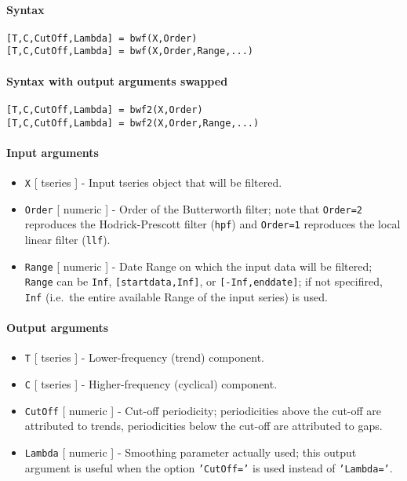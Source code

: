 


	\paragraph{Syntax}

\begin{verbatim}
[T,C,CutOff,Lambda] = bwf(X,Order)
[T,C,CutOff,Lambda] = bwf(X,Order,Range,...)
\end{verbatim}

\paragraph{Syntax with output arguments
swapped}

\begin{verbatim}
[T,C,CutOff,Lambda] = bwf2(X,Order)
[T,C,CutOff,Lambda] = bwf2(X,Order,Range,...)
\end{verbatim}

\paragraph{Input arguments}

\begin{itemize}
\item
  \texttt{X} {[} tseries {]} - Input tseries object that will be
  filtered.
\item
  \texttt{Order} {[} numeric {]} - Order of the Butterworth filter; note
  that \texttt{Order=2} reproduces the Hodrick-Prescott filter
  (\texttt{hpf}) and \texttt{Order=1} reproduces the local linear filter
  (\texttt{llf}).
\item
  \texttt{Range} {[} numeric {]} - Date Range on which the input data
  will be filtered; \texttt{Range} can be \texttt{Inf},
  \texttt{{[}startdata,Inf{]}}, or \texttt{{[}-Inf,enddate{]}}; if not
  specifired, \texttt{Inf} (i.e.~the entire available Range of the input
  series) is used.
\end{itemize}

\paragraph{Output arguments}

\begin{itemize}
\item
  \texttt{T} {[} tseries {]} - Lower-frequency (trend) component.
\item
  \texttt{C} {[} tseries {]} - Higher-frequency (cyclical) component.
\item
  \texttt{CutOff} {[} numeric {]} - Cut-off periodicity; periodicities
  above the cut-off are attributed to trends, periodicities below the
  cut-off are attributed to gaps.
\item
  \texttt{Lambda} {[} numeric {]} - Smoothing parameter actually used;
  this output argument is useful when the option \texttt{'CutOff='} is
  used instead of \texttt{'Lambda='}.
\end{itemize}


